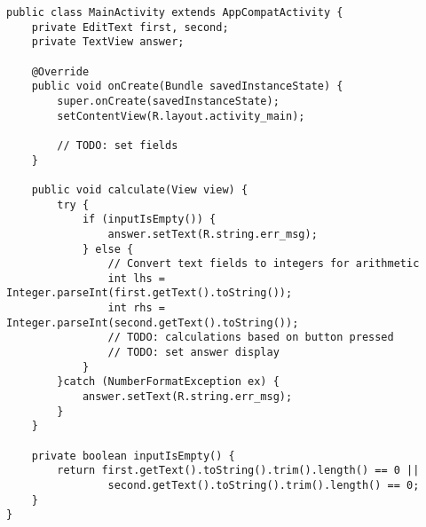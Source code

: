 \begin{lstlisting}[style=A_Java, caption={Assignment template}, label={listing:asigtemp}]
public class MainActivity extends AppCompatActivity {
    private EditText first, second;
    private TextView answer;

    @Override
    public void onCreate(Bundle savedInstanceState) {
        super.onCreate(savedInstanceState);
        setContentView(R.layout.activity_main);
        
        // TODO: set fields
    }

    public void calculate(View view) {
        try {
            if (inputIsEmpty()) {
                answer.setText(R.string.err_msg);
            } else {
                // Convert text fields to integers for arithmetic
                int lhs = Integer.parseInt(first.getText().toString());
                int rhs = Integer.parseInt(second.getText().toString());
                // TODO: calculations based on button pressed
                // TODO: set answer display
            }
        }catch (NumberFormatException ex) {
            answer.setText(R.string.err_msg);
        }
    }

    private boolean inputIsEmpty() {
        return first.getText().toString().trim().length() == 0 ||
                second.getText().toString().trim().length() == 0;
    }
}
\end{lstlisting}
